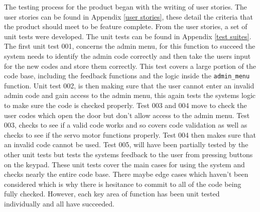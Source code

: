 
  The testing process for the product began with the writing of user stories.
  The user stories can be found in Appendix \ref{user stories}, these detail the criteria that the product should meet to be feature complete.
  From the user stories, a set of unit tests were developed.
  The unit tests can be found in Appendix \ref{test suites}.
The first unit test 001, concerns the admin menu, for this function to succeed the system needs to identify the admin code correctly and then take the users input for the new codes and store them correctly.
This test covers a large portion of the code base, including the feedback functions and the logic inside the \verb|admin_menu| function.
Unit test 002, is then making sure that the user cannot enter an invalid admin code and gain access to the admin menu, this again tests the systems logic to make sure the code is checked properly.
Test 003 and 004 move to check the user codes which open the door but don't allow access to the admin menu.
Test 003, checks to see if a valid code works and so covers code validation as well as checks to see if the servo motor functions properly.
Test 004 then makes sure that an invalid code cannot be used.
Test 005, will have been partially tested by the other unit tests but tests the systems feedback to the user from pressing buttons on the keypad.
These unit tests cover the main cases for using the system and checks nearly the entire code base.
There maybe edge cases which haven't been considered which is why there is hesitance to commit to all of the code being fully checked.
However, each key area of function has been unit tested individually and all have succeeded.

